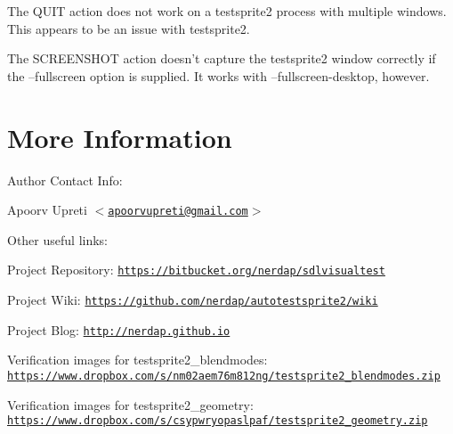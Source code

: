 \begin{DoxyItemize}
\item The Q\-U\-I\-T action does not work on a testsprite2 process with multiple windows. This appears to be an issue with testsprite2. \item The S\-C\-R\-E\-E\-N\-S\-H\-O\-T action doesn't capture the testsprite2 window correctly if the --fullscreen option is supplied. It works with --fullscreen-\/desktop, however.\end{DoxyItemize}
\hypertarget{index_moreinfo_sec}{}\section{More Information}\label{index_moreinfo_sec}
Author Contact Info\-:\par
 Apoorv Upreti {\ttfamily $<$\href{mailto:apoorvupreti@gmail.com}{\tt apoorvupreti@gmail.\-com}$>$} 

Other useful links\-:
\begin{DoxyItemize}
\item Project Repository\-: \href{https://bitbucket.org/nerdap/sdlvisualtest}{\tt https\-://bitbucket.\-org/nerdap/sdlvisualtest}
\item Project Wiki\-: \href{https://github.com/nerdap/autotestsprite2/wiki}{\tt https\-://github.\-com/nerdap/autotestsprite2/wiki}
\item Project Blog\-: \href{http://nerdap.github.io}{\tt http\-://nerdap.\-github.\-io}
\item Verification images for testsprite2\-\_\-blendmodes\-: \href{https://www.dropbox.com/s/nm02aem76m812ng/testsprite2_blendmodes.zip}{\tt https\-://www.\-dropbox.\-com/s/nm02aem76m812ng/testsprite2\-\_\-blendmodes.\-zip}
\item Verification images for testsprite2\-\_\-geometry\-: \href{https://www.dropbox.com/s/csypwryopaslpaf/testsprite2_geometry.zip}{\tt https\-://www.\-dropbox.\-com/s/csypwryopaslpaf/testsprite2\-\_\-geometry.\-zip} 
\end{DoxyItemize}